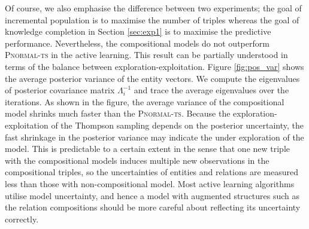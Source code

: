 Of course, we also emphasise the difference between two experiments;
the goal of incremental population is to maximise the number of triples
whereas the goal of knowledge completion in Section \ref{sec:exp1} is to maximise
the predictive performance. Nevertheless, the compositional models do not outperform
\textsc{Pnormal-ts} in the active learning.
This result can be partially understood in terms of the balance between
exploration-exploitation. Figure \ref{fig:pos_var} shows the average posterior variance of
the entity vectors. We compute the eigenvalues of posterior covariance matrix $\Lambda_i^{-1}$
and trace the average eigenvalues over the iterations.
As shown in the figure, the average variance of the compositional model shrinks much faster
than the \textsc{Pnormal-ts}. Because the exploration-exploitation of the Thompson sampling depends on the
posterior uncertainty, the fast shrinkage in the posterior variance may indicate the under
exploration of the model. This is predictable to a certain extent in the sense that one new triple with the compositional models induces multiple new
observations in the compositional triples, so the uncertainties of entities and
relations are measured less than those with non-compositional model. Most active
learning algorithms utilise model uncertainty, and hence a model with augmented
structures such as the relation compositions should be more careful about reflecting its uncertainty correctly.
